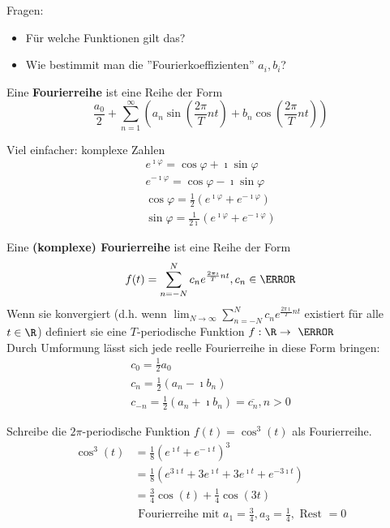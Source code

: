 Fragen:
\begin{itemize}
	\item Für welche Funktionen gilt das?
	\item Wie bestimmit man die ''Fourierkoeffizienten'' $a_i, b_i$?
\end{itemize}
\begin{def*}[note = Fourierreihe , index = Fourier reihe , indexformat = {1!~.2 2!1.~}]
	Eine \textbf{Fourierreihe} ist eine Reihe der Form
	\[ \frac{a_0}{2} + \sum_{n=1}^\infty \left( a_n \sin\left( \frac{2\pi}{T} nt \right) + b_n \cos\left( \frac{2\pi}{T} nt \right) \right) \]
\end{def*}
Viel einfacher: komplexe Zahlen
\begin{gather*}
	e^{\imath \varphi} = \cos \varphi + \imath \sin \varphi \\
	e^{-\imath \varphi} = \cos \varphi - \imath \sin \varphi \\
	\cos \varphi = \frac{1}{2} \left( e^{\imath \varphi} + e^{-\imath \varphi} \right) \\
	\sin \varphi = \frac{1}{2\imath} \left( e^{\imath \varphi} + e^{-\imath \varphi} \right)
\end{gather*}
\begin{def*}[note = komplexe Fourierreihe , index = komplexe Fourier reihe , indexformat = {2!~.3!1~ 3!2.~!1~}]
	Eine \textbf{(komplexe) Fourierreihe} ist eine Reihe der Form
	\[ f(t) = \sum_{n=-N}^N c_n e^{\frac{2\pi\imath}{T} nt} , c_n \in \C \]
	Wenn sie konvergiert (d.h. wenn $\lim_{N \rightarrow \infty} \sum_{n=-N}^N c_n e^{\frac{2\pi\imath}{T} nt}$ existiert für alle $t \in \R$) definiert sie eine $T$-periodische Funktion $f: \R \rightarrow \C$ \\
	Durch Umformung lässt sich jede reelle Fourierreihe in diese Form bringen:
	\begin{gather*}
		c_0 = \frac{1}{2} a_0 \\
		c_n = \frac{1}{2} \left( a_n - \imath b_n \right) \\
		c_{-n} = \frac{1}{2} \left( a_n + \imath b_n \right) = \overline{c_n} , n > 0
	\end{gather*}
\end{def*} 
\begin{bsp*}
	Schreibe die $2\pi$-periodische Funktion $f(t) = \cos^3(t)$ als Fourierreihe.
	\[ \begin{split}
		\cos^3(t)	&= \frac{1}{8} \left( e^{\imath t} + e^{-\imath t} \right)^3 \\
				&= \frac{1}{8} \left( e^{3\imath t} + 3e^{\imath t} + 3e^{\imath t} + e^{-3\imath t} \right) \\
				&= \frac{3}{4} \cos(t) + \frac{1}{4} \cos(3t) \\
				&\text{ Fourierreihe mit } a_1 = \frac{3}{4} , a_3 = \frac{1}{4} , \text{ Rest } = 0
	\end{split}\]
\end{bsp*}

